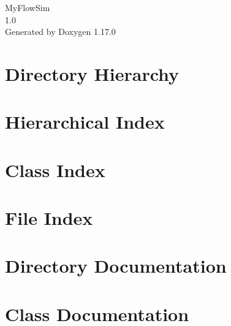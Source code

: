 \documentclass[twoside]{book}
\newcommand{\+}{\discretionary{\mbox{\scriptsize$\hookleftarrow$}}{}{}}
\newcommand{\clearemptydoublepage}{%
    \newpage{\pagestyle{empty}\cleardoublepage}%
  }
\begin{document}
  \raggedbottom
    \hypersetup{pageanchor=false,
                bookmarksnumbered=true,
                pdfencoding=unicode
               }
  \begin{titlepage}
  \vspace*{7cm}
  \begin{center}%
  {\Large My\+Flow\+Sim}\\
  [1ex]\large 1.\+0 \\
  \vspace*{1cm}
  {\large Generated by Doxygen 1.17.0}\\
  \end{center}
  \end{titlepage}
  \clearemptydoublepage
  \tableofcontents
  \clearemptydoublepage
  \hypersetup{pageanchor=true}
\chapter{Directory Hierarchy}

\chapter{Hierarchical Index}

\chapter{Class Index}

\chapter{File Index}

\chapter{Directory Documentation}





\chapter{Class Documentation}






\end{document}
